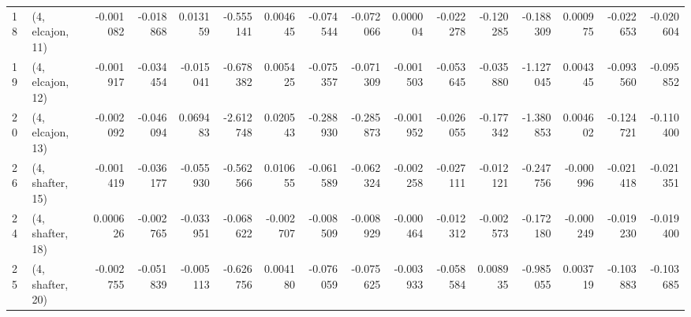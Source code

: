\begin{tabular}{llrrrrrrrrrrrrrr}
18 &  (4, elcajon, 11) &  -0.001082 & -0.018868 &  0.013159 &  -0.555141 &  0.004645 &  -0.074544 & -0.072066 &  0.000004 & -0.022278 & -0.120285 &  -0.188309 &  0.000975 & -0.022653 & -0.020604 \\
19 &  (4, elcajon, 12) &  -0.001917 & -0.034454 & -0.015041 &  -0.678382 &  0.005425 &  -0.075357 & -0.071309 & -0.001503 & -0.053645 & -0.035880 &  -1.127045 &  0.004345 & -0.093560 & -0.095852 \\
20 &  (4, elcajon, 13) &  -0.002092 & -0.046094 &  0.069483 &  -2.612748 &  0.020543 &  -0.288930 & -0.285873 & -0.001952 & -0.026055 & -0.177342 &  -1.380853 &  0.004602 & -0.124721 & -0.110400 \\
26 &  (4, shafter, 15) &  -0.001419 & -0.036177 & -0.055930 &  -0.562566 &  0.010655 &  -0.061589 & -0.062324 & -0.002258 & -0.027111 & -0.012121 &  -0.247756 & -0.000996 & -0.021418 & -0.021351 \\
24 &  (4, shafter, 18) &   0.000626 & -0.002765 & -0.033951 &  -0.068622 & -0.002707 &  -0.008509 & -0.008929 & -0.000464 & -0.012312 & -0.002573 &  -0.172180 & -0.000249 & -0.019230 & -0.019400 \\
25 &  (4, shafter, 20) &  -0.002755 & -0.051839 & -0.005113 &  -0.626756 &  0.004180 &  -0.076059 & -0.075625 & -0.003933 & -0.058584 &  0.008935 &  -0.985055 &  0.003719 & -0.103883 & -0.103685 \\
\bottomrule
\end{tabular}
